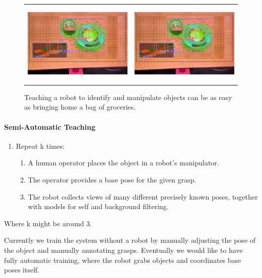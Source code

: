 \documentclass[12pt]{article}
\numberwithin{equation}{section}
\numberwithin{table}{section}
\numberwithin{figure}{section}
\begin{document}
\begin{figure}
  \begin{center}
    \begin{tabular}{l c}
      \includegraphics[width=200px, height=150px]{detect.png} &
      \includegraphics[width=200px, height=150px]{detect.png} \\
    \end{tabular}
  \end{center}
  \caption{Teaching a robot to identify and manipulate objects can be as easy as bringing home
	    a bag of groceries.}
\end{figure}

\paragraph{Semi-Automatic Teaching}

\begin{enumerate}
  \item Repeat k times:
  \begin{enumerate}
    \item A human operator places the object in a robot's manipulator.
    \item The operator provides a base pose for the given grasp.
    \item The robot collects views of many different precisely known poses, together with models for self and background filtering.
  \end{enumerate}
\end{enumerate}

Where k might be around 3. 

Currently we train the system without a robot by manually adjusting the pose of the object and manually
annotating grasps. Eventually we would like to have fully automatic training, where the
robot grabs objects and coordinates base poses itself.
\end{document}

